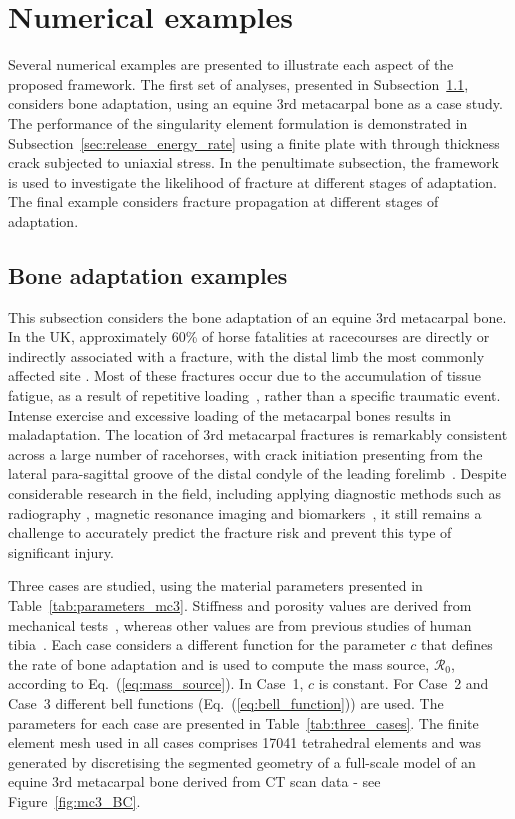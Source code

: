 \documentclass[review]{elsarticle}
\numberwithin{equation}{section}
\begin{document}
\section{Numerical examples}
\label{sec:numerical_examples}
Several numerical examples are presented to illustrate each aspect of the proposed framework. 
The first set of analyses, presented in Subsection~\ref{sec:numerical_examples:bone_adap}, considers bone adaptation, using an equine 3rd metacarpal bone as a case study.
The performance of the singularity element formulation is demonstrated in Subsection~\ref{sec:release_energy_rate} using a finite plate with through thickness crack subjected to uniaxial stress. In the penultimate subsection, the framework is used to investigate the likelihood of fracture at different  stages of adaptation. The final example considers fracture propagation at different stages of adaptation.

\subsection{Bone adaptation examples}
\label{sec:numerical_examples:bone_adap}
This subsection considers the bone adaptation of an equine 3rd metacarpal bone. 
In the UK, approximately 60\% of horse fatalities at racecourses are directly or indirectly associated with a fracture, with the distal limb the most commonly affected site \citep{parkin2004risk}.
Most of these fractures occur due to the accumulation of tissue fatigue, as a result of repetitive loading~\citep{Parkin2005}, rather than a specific traumatic event. 
Intense exercise and excessive loading of the metacarpal bones results in maladaptation. 
The location of 3rd metacarpal fractures is remarkably consistent across a large number of racehorses,  with crack initiation presenting from 
the lateral para-sagittal groove of the distal condyle of the leading forelimb~\citep{jacklin2012frequency, parkin2006analysis}.
Despite considerable research in the field, including applying diagnostic methods such as radiography 
\citep{bogers2016quantitative, crijns2014intramodality, loughridge2017qualitative}, magnetic resonance imaging 
\citep{tranquille2017MRI} and biomarkers~\citep{mcilwraith2005use}, it still remains a challenge to accurately predict the fracture risk 
and prevent this type of significant injury.

Three cases are studied, using the material parameters presented in Table~\ref{tab:parameters_mc3}.
Stiffness and porosity values are derived from mechanical tests~\citep{Les1994}, whereas other values are from previous studies of human tibia~\citep{Pang2012,Waffenschmidt2012}. Each case considers a different function for the parameter $c$ that defines the rate of bone adaptation and is used to compute the mass source, $\mathcal{R}_0$, according to Eq.~(\ref{eq:mass_source}).
In Case~1, $c$ is constant. For Case~2 and Case~3 different bell functions (Eq.~(\ref{eq:bell_function})) are used. The parameters for each case are presented in Table~\ref{tab:three_cases}. 
The finite element mesh used in all cases comprises 17041 tetrahedral elements and was generated by discretising the segmented geometry of a full-scale model of an equine 3rd metacarpal bone derived from CT scan data - see Figure~\ref{fig:mc3_BC}.
\end{document}
